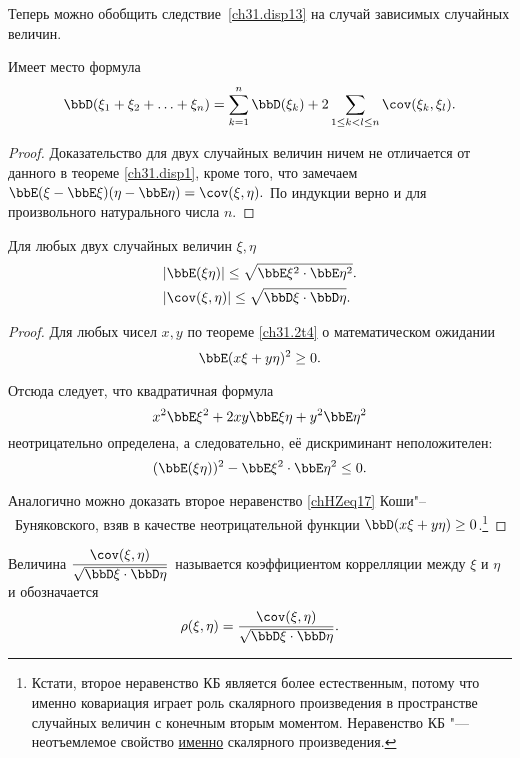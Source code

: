 Теперь можно обобщить следствие~\ref{ch31.disp13} на случай зависимых случайных величин.
\begin{thm}
Имеет место формула
$$
\bbD(\xi_1 + \xi_2 + \ldots + \xi_n) = \sum\limits_{k=1}^{n} \bbD(\xi_k) + 2 \sum\limits_{1\le k < l \le n} \cov (\xi_k,\xi_l).
$$
\end{thm}
\begin{proof}
Доказательство для двух случайных величин ничем не отличается от данного в теореме \ref{ch31.disp1}, кроме того, что замечаем  $\bbE(\xi - \bbE\xi)(\eta - \bbE\eta)=\cov (\xi,\eta).$ По индукции верно и для произвольного натурального числа $n$.
\end{proof}
\begin{thm}
Для любых двух случайных величин $\xi, \eta$
\begin{align}
&|\bbE(\xi\eta)| \le \sqrt{\bbE\xi^2 \cdot \bbE\eta^2}.\\
&|\cov(\xi,\eta)| \le \sqrt{\bbD\xi\cdot \bbD\eta}.\label{chHZeq17}
\end{align}
\end{thm}
\begin{proof}
Для любых чисел $x, y$ по теореме \ref{ch31.2t4} о математическом ожидании 
$$
\bbE(x\xi + y\eta)^2 \ge 0.
$$

Отсюда следует, что квадратичная формула
$$
x^2\bbE\xi^2 + 2xy\bbE\xi\eta + y^2\bbE\eta^2
$$
неотрицательно определена, а следовательно, её дискриминант неположителен:
$$
(\bbE(\xi\eta))^2 - \bbE\xi^2 \cdot \bbE\eta^2 \le 0.
$$

Аналогично можно доказать второе неравенство \eqref{chHZeq17} Коши"--~Буняковского, взяв в качестве неотрицательной функции $\bbD(x\xi + y\eta)\ge 0$.\footnote{Кстати, второе неравенство КБ является более естественным, потому что именно ковариация играет роль скалярного произведения в пространстве случайных величин с конечным вторым моментом. Неравенство КБ "--- неотъемлемое свойство \underline{именно} скалярного произведения.}
\end{proof}

\begin{defn}
Величина $\displaystyle\frac{\cov(\xi,\eta)}{\sqrt{\bbD\xi\cdot \bbD\eta}}$ называется коэффициентом коррелляции между $\xi$ и $\eta$  и обозначается $$\rho (\xi,\eta) = \frac{\cov(\xi,\eta)}{\sqrt{\bbD\xi\cdot \bbD\eta}}.$$
\end{defn}

